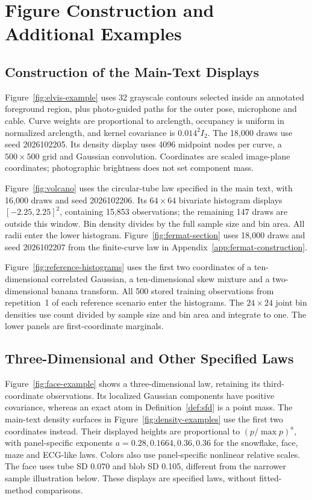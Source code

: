 \section{Figure Construction and Additional Examples}
\label{app:visual-examples}
\subsection{Construction of the Main-Text Displays}
Figure~\ref{fig:elvis-example} uses 32 grayscale contours selected inside
an annotated foreground region, plus photo-guided paths for the outer pose,
microphone and cable. Curve weights are proportional to arclength, occupancy
is uniform in normalized arclength, and kernel covariance is $0.014^2I_2$.
The 18,000 draws use seed 2026102205. Its density display uses 4096 midpoint
nodes per curve, a $500\times500$ grid and Gaussian convolution. Coordinates
are scaled image-plane coordinates; photographic brightness does not set
component mass.

Figure~\ref{fig:volcano} uses the circular-tube law specified in the main
text, with 16,000 draws and seed 2026102206. Its $64\times64$ bivariate
histogram displays $[-2.25,2.25]^2$, containing 15,853 observations; the
remaining 147 draws are outside this window. Bin density divides by the
full sample size and bin area. All radii enter the lower histogram.
Figure~\ref{fig:fermat-section} uses 18,000 draws and seed 2026102207
from the finite-curve law in Appendix~\ref{app:fermat-construction}.

Figure~\ref{fig:reference-histograms} uses the first two coordinates of
a ten-dimensional correlated Gaussian, a ten-dimensional skew mixture and
a two-dimensional banana transform. All 500 stored training observations
from repetition~1 of each reference scenario enter the histograms. The
$24\times24$ joint bin densities use count divided by sample size and bin
area and integrate to one. The lower panels are first-coordinate marginals.

\subsection{Three-Dimensional and Other Specified Laws}
Figure~\ref{fig:face-example} shows a three-dimensional law, retaining its
third-coordinate observations. Its localized Gaussian components have
positive covariance, whereas an exact atom in Definition~\ref{def:sfd}
is a point mass. The main-text density surfaces in
Figure~\ref{fig:density-examples} use the first two coordinates instead.
Their displayed heights are proportional to $(p/\max p)^a$, with
panel-specific exponents $a=0.28,0.1664,0.36,0.36$ for the snowflake,
face, maze and ECG-like laws. Colors also use panel-specific nonlinear
relative scales. The face uses tube SD 0.070 and blob SD 0.105, different
from the narrower sample illustration below. These displays are specified
laws, without fitted-method comparisons.

